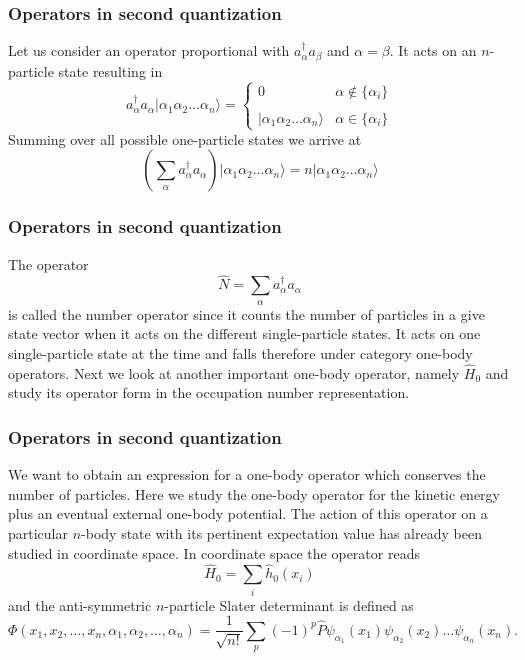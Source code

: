 \documentclass[compress]{beamer}
\newcommand*{\ket}[1]{|#1\rangle}
\begin{document}
\frame
{
  \frametitle{Operators in second quantization}
\begin{small}
{\scriptsize
Let us consider an operator proportional with $a_\alpha^\dagger a_\beta$ and 
$\alpha=\beta$. It acts on an $n$-particle state 
resulting in
\begin{equation}
	a_\alpha^\dagger a_\alpha \ket{\alpha_1\alpha_2 \dots \alpha_{n}} = 
	\begin{cases}
		0  &\alpha \notin \{\alpha_i\} \\
		\\
		\ket{\alpha_1\alpha_2 \dots \alpha_{n}} & \alpha \in \{\alpha_i\}
	\end{cases}
\end{equation}
Summing over all possible one-particle states we arrive at
\begin{equation}
	\left( \sum_\alpha a_\alpha^\dagger a_\alpha \right) \ket{\alpha_1\alpha_2 \dots \alpha_{n}} = 
	n \ket{\alpha_1\alpha_2 \dots \alpha_{n}} \label{eq:2-21}
\end{equation}
}
\end{small}
}


\frame
{
  \frametitle{Operators in second quantization}
\begin{small}
{\scriptsize
The operator 
\begin{equation}
	\hat{N} = \sum_\alpha a_\alpha^\dagger a_\alpha \label{eq:2-22}
\end{equation}
is called the number operator since it counts the number of particles in a give state vector when it acts 
on the different single-particle states.  It acts on one single-particle state at the time and falls 
therefore under category one-body operators.
Next we look at another important one-body operator, namely $\hat{H}_0$ and study its operator form in the 
occupation number representation.
}
\end{small}
}


\frame
{
  \frametitle{Operators in second quantization}
\begin{small}
{\scriptsize
We want to obtain an expression for a one-body operator which conserves the number of particles.
Here we study the one-body operator for the kinetic energy plus an eventual external one-body potential.
The action of this operator on a particular $n$-body state with its pertinent expectation value has already
been studied in coordinate  space.
In coordinate space the operator reads
\begin{equation}
	\hat{H}_0 = \sum_i \hat{h}_0(x_i) \label{eq:2-23}
\end{equation}
and the anti-symmetric $n$-particle Slater determinant is defined as 
\begin{equation}
\Phi(x_1, x_2,\dots ,x_n,\alpha_1,\alpha_2,\dots, \alpha_n)= \frac{1}{\sqrt{n!}} \sum_p (-1)^p\hat{P}
		\psi_{\alpha_1}(x_1)\psi_{\alpha_2}(x_2) \dots \psi_{\alpha_n}(x_n).\label{eq:2-24}
\end{equation}
}
\end{small}
}
\end{document}
